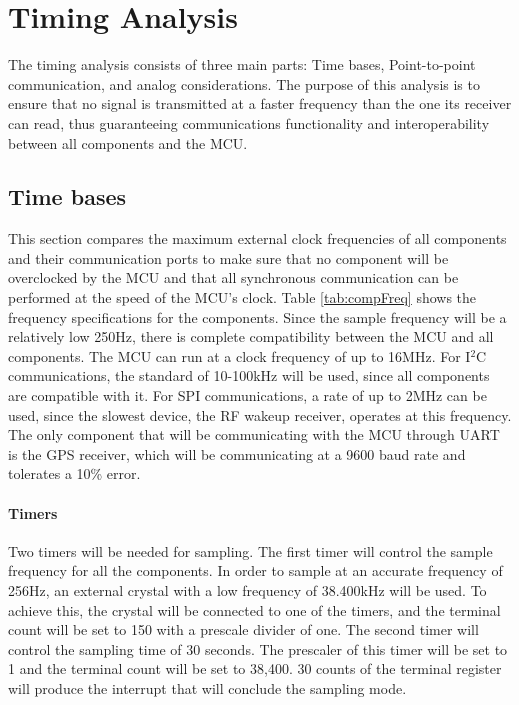 \section{Timing Analysis}
The timing analysis consists of three main parts: Time bases, Point-to-point communication, and analog considerations. The purpose of this analysis is to ensure that no signal is transmitted at a faster frequency than the one its receiver can read, thus guaranteeing communications functionality and interoperability between all components and the MCU.

\subsection{Time bases}
This section compares the maximum external clock frequencies of all components and their communication ports to make sure that no component will be overclocked by the MCU and that all synchronous communication can be performed at the speed of the MCU's clock. Table \ref{tab:compFreq} shows the frequency specifications for the components.  Since the sample frequency will be a relatively low 250Hz, there is complete compatibility between the MCU and all components. The MCU can run at a clock frequency of up to 16MHz. For I$^2$C communications, the standard of 10-100kHz will be used, since all components are compatible with it. For SPI communications, a rate of up to 2MHz can be used, since the slowest device, the RF wakeup receiver, operates at this frequency. The only component that will be communicating with the MCU through UART is the GPS receiver, which will be communicating at a 9600 baud rate and tolerates a 10\% error.

\paragraph{Timers}

Two timers will be needed for sampling. The first timer will control the sample frequency for all the components.  In order to sample at an accurate frequency of 256Hz, an external crystal with a low frequency of 38.400kHz will be used. To achieve this, the crystal will be connected to one of the timers, and the terminal count will be set to 150 with a prescale divider of one. The second timer will control the sampling time of 30 seconds. The prescaler of this timer will be set to 1 and the terminal count will be set to 38,400. 30 counts of the terminal register will produce the interrupt that will conclude the sampling mode.

